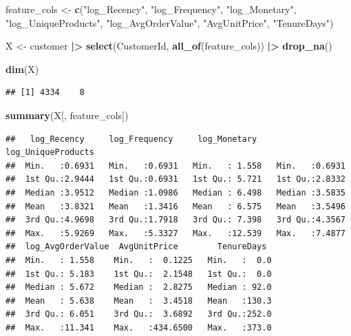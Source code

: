 \documentclass[
]{article}
\newenvironment{Shaded}{\begin{snugshade}}{\end{snugshade}}
\newcommand{\FunctionTok}[1]{\textcolor[rgb]{0.13,0.29,0.53}{\textbf{#1}}}
\newcommand{\NormalTok}[1]{#1}
\newcommand{\OtherTok}[1]{\textcolor[rgb]{0.56,0.35,0.01}{#1}}
\newcommand{\SpecialCharTok}[1]{\textcolor[rgb]{0.81,0.36,0.00}{\textbf{#1}}}
\newcommand{\StringTok}[1]{\textcolor[rgb]{0.31,0.60,0.02}{#1}}
\begin{document}
\begin{Shaded}
\begin{Highlighting}[]
\NormalTok{feature\_cols }\OtherTok{\textless{}{-}} \FunctionTok{c}\NormalTok{(}\StringTok{"log\_Recency"}\NormalTok{, }\StringTok{"log\_Frequency"}\NormalTok{, }\StringTok{"log\_Monetary"}\NormalTok{,}
                  \StringTok{"log\_UniqueProducts"}\NormalTok{, }\StringTok{"log\_AvgOrderValue"}\NormalTok{,}
                  \StringTok{"AvgUnitPrice"}\NormalTok{, }\StringTok{"TenureDays"}\NormalTok{)}

\NormalTok{X }\OtherTok{\textless{}{-}}\NormalTok{ customer }\SpecialCharTok{|\textgreater{}}
  \FunctionTok{select}\NormalTok{(CustomerId, }\FunctionTok{all\_of}\NormalTok{(feature\_cols)) }\SpecialCharTok{|\textgreater{}}
  \FunctionTok{drop\_na}\NormalTok{()}

\FunctionTok{dim}\NormalTok{(X)}
\end{Highlighting}
\end{Shaded}

\begin{verbatim}
## [1] 4334    8
\end{verbatim}

\begin{Shaded}
\begin{Highlighting}[]
\FunctionTok{summary}\NormalTok{(X[, feature\_cols])}
\end{Highlighting}
\end{Shaded}

\begin{verbatim}
##   log_Recency     log_Frequency     log_Monetary    log_UniqueProducts
##  Min.   :0.6931   Min.   :0.6931   Min.   : 1.558   Min.   :0.6931    
##  1st Qu.:2.9444   1st Qu.:0.6931   1st Qu.: 5.721   1st Qu.:2.8332    
##  Median :3.9512   Median :1.0986   Median : 6.498   Median :3.5835    
##  Mean   :3.8321   Mean   :1.3416   Mean   : 6.575   Mean   :3.5496    
##  3rd Qu.:4.9698   3rd Qu.:1.7918   3rd Qu.: 7.398   3rd Qu.:4.3567    
##  Max.   :5.9269   Max.   :5.3327   Max.   :12.539   Max.   :7.4877    
##  log_AvgOrderValue  AvgUnitPrice        TenureDays   
##  Min.   : 1.558    Min.   :  0.1225   Min.   :  0.0  
##  1st Qu.: 5.183    1st Qu.:  2.1548   1st Qu.:  0.0  
##  Median : 5.672    Median :  2.8275   Median : 92.0  
##  Mean   : 5.638    Mean   :  3.4518   Mean   :130.3  
##  3rd Qu.: 6.051    3rd Qu.:  3.6892   3rd Qu.:252.0  
##  Max.   :11.341    Max.   :434.6500   Max.   :373.0
\end{verbatim}
\end{document}
